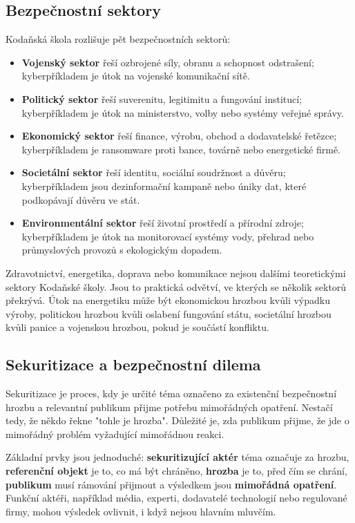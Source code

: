 \subsection*{Bezpečnostní sektory}
Kodaňská škola rozlišuje pět bezpečnostních sektorů:
\begin{itemize}
  \item \textbf{Vojenský sektor} řeší ozbrojené síly, obranu a schopnost odstrašení; kyberpříkladem je útok na vojenské komunikační sítě.
  \item \textbf{Politický sektor} řeší suverenitu, legitimitu a fungování institucí; kyberpříkladem je útok na ministerstvo, volby nebo systémy veřejné správy.
  \item \textbf{Ekonomický sektor} řeší finance, výrobu, obchod a dodavatelské řetězce; kyberpříkladem je ransomware proti bance, továrně nebo energetické firmě.
  \item \textbf{Societální sektor} řeší identitu, sociální soudržnost a důvěru; kyberpříkladem jsou dezinformační kampaně nebo úniky dat, které podkopávají důvěru ve stát.
  \item \textbf{Environmentální sektor} řeší životní prostředí a přírodní zdroje; kyberpříkladem je útok na monitorovací systémy vody, přehrad nebo průmyslových provozů s ekologickým dopadem.
\end{itemize}

Zdravotnictví, energetika, doprava nebo komunikace nejsou dalšími teoretickými sektory Kodaňské školy. Jsou to praktická odvětví, ve kterých se několik sektorů překrývá. Útok na energetiku může být ekonomickou hrozbou kvůli výpadku výroby, politickou hrozbou kvůli oslabení fungování státu, societální hrozbou kvůli panice a vojenskou hrozbou, pokud je součástí konfliktu.

\subsection*{Sekuritizace a bezpečnostní dilema}
Sekuritizace je proces, kdy je určité téma označeno za existenční bezpečnostní hrozbu a relevantní publikum přijme potřebu mimořádných opatření. Nestačí tedy, že někdo řekne "tohle je hrozba". Důležité je, zda publikum přijme, že jde o mimořádný problém vyžadující mimořádnou reakci.

Základní prvky jsou jednoduché: \textbf{sekuritizující aktér} téma označuje za hrozbu, \textbf{referenční objekt} je to, co má být chráněno, \textbf{hrozba} je to, před čím se chrání, \textbf{publikum} musí rámování přijmout a výsledkem jsou \textbf{mimořádná opatření}. Funkční aktéři, například média, experti, dodavatelé technologií nebo regulované firmy, mohou výsledek ovlivnit, i když nejsou hlavním mluvčím.

